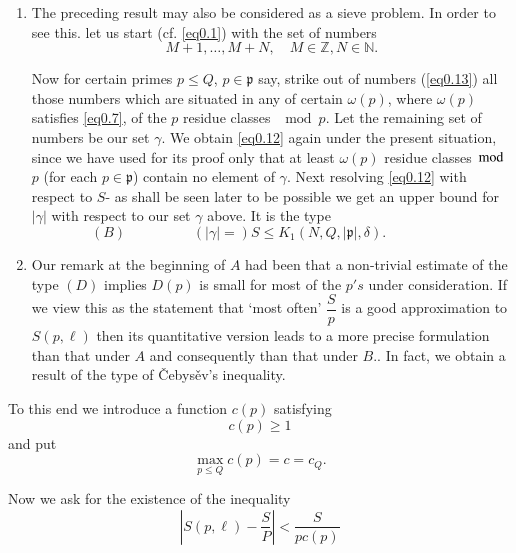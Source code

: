 \begin{enumerate}
\item The preceding
result may also be considered as a sieve problem. In order to see
this. let us start (cf. \eqref{eq0.1}) with the set of numbers 
\begin{equation*}
M+1 , \ldots , M+N,\quad M \in \mathbb{Z}, N \in
\mathbb{N}.\tag{0.13}\label{eq0.13} 
\end{equation*}

Now for certain primes $p \leq Q$, $p \in \mathfrak{p}$ say, strike out
of numbers (\ref{eq0.13}) all those numbers which are situated in any of
certain $\omega(p)$, where $\omega(p)$ satisfies \eqref{eq0.7}, of the $p$
residue classes $\mod p$. Let the remaining set of numbers be our set
$\gamma$. We obtain \eqref{eq0.12} again under the present situation, since
we have used for its proof only that at least $\omega(p)$ residue
classes $\mod$ $p$ (for each $p \in \mathfrak{p}$) contain no element
of $\gamma$. Next resolving \eqref{eq0.12} with respect to $S$- as shall be
seen later to be possible we get an upper bound for $|\gamma|$ with
respect to our set $\gamma$ above. It is the type  
\begin{equation*}
(B) \hspace{2cm}
 (|\gamma|=) S \leq K_1 (N,Q,|\mathfrak{p}|, \delta
  ). \hspace{2cm} \tag{0.14}\label{eq0.14} 
\end{equation*}

\item Our remark at the beginning of $A$ had been that a non-trivial
  estimate of the type $(D)$ implies $D(p)$ is small for most of the
  $p's$ under consideration. If we view this as the statement that
  `most often' $\dfrac{S}{p}$ is a good approximation to $S(p, \ell)$
  then its quantitative version leads to a more precise formulation
  than that under $A$ and consequently than that under $B$.. In fact,
  we obtain a result of the type of
  \v{C}ebys\v{e}v's inequality. 
\end{enumerate}

To this end we introduce a function $c(p)$ satisfying
\begin{equation*}
c(p) \geq 1 \tag{0.15}\label{eq0.15}
\end{equation*}
and put 
\begin{equation*}
\max\limits_{p\leq Q} c(p) = c =c_Q.  \tag{0.16}\label{eq0.16}
 \end{equation*} \pageoriginale
 
Now we ask for the existence of the inequality 
\begin{equation*}
|S(p,\ell)-\frac{S}{P}|<\frac{S}{pc(p)}\tag{0.17}\label{eq0.17} 
\end{equation*}

